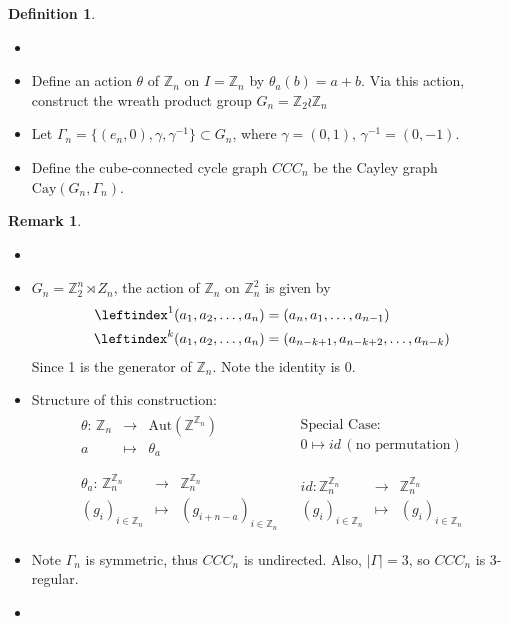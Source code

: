 \documentclass{book}
\newcommand{\Z}{\mathbb{Z}}
\newcommand{\abs}[1]{\lvert #1 \rvert }
\newcommand{\Cay}[1]{\textrm{Cay}( #1 )}
\newcommand{\Aut}[1]{\textrm{Aut}( #1 )}
\theoremstyle{definition}
\newtheorem{definition}[lemma]{Definition}
\theoremstyle{remarkstyle}
\newtheorem*{remark}{Remark}%
\begin{document}
\begin{definition}
\begin{itemize}
    \item[]
    \item Define an action $\theta$ of $\Z_{n} $ on $I = \Z_{n} $ by $\theta_{a}(b) = a+b $. Via this action, construct the wreath product group $G_{n} = \Z_{2} \wr \Z_{n} $
    \item Let $\Gamma_{n} = \{(e_{n},0),\gamma,\gamma^{-1}\} \subset G_{n} $, where $\gamma =(0,1), \, \gamma^{-1}=(0,-1) $.
    \item Define the cube-connected cycle graph $CCC_{n} $ be the Cayley graph $\Cay{G_{n}, \Gamma_{n}}$.
\end{itemize}
\end{definition}
\begin{remark}
\begin{itemize}
    \item[]
    \item $G_{n} = \Z^{n}_{2}\rtimes Z_{n} $, the action of $\Z_{n} $ on $\Z^{2}_{n} $ is given by 
    \begin{align*}
        \leftindex^{1} (a_{1},a_{2},\dots,a_{n}) &= (a_{n},a_{1},\dots,a_{n-1}) \\
        \leftindex^{k} (a_{1},a_{2},\dots,a_{n}) &= (a_{n-k+1},a_{n-k+2},\dots,a_{n-k})
    \end{align*}
    Since 1 is the generator of $\Z_{n} $. Note the identity is 0.
    \item Structure of this construction:
            $$
        \begin{array}{cc}
            \begin{array}{rcl}
                \theta: \, \Z_{n}  & \rightarrow & \Aut{\Z^{\Z_{n}} } \\
                a & \mapsto & \theta_{a}
            \end{array} & \begin{array}{c}
                \textrm{Special Case:} \\
                 0 \mapsto id \, (\textrm{no permutation})
            \end{array}  \\
            & \\
             \begin{array}{rcl}
                \theta_{a} : \, \Z_{n}^{\Z_{n}} &\rightarrow & \Z_{n}^{\Z_{n}} \\
                (g_{i})_{i\in \Z_{n}} &\mapsto & (g_{i+n-a})_{i\in \Z_{n} }
            \end{array} & \begin{array}{rcl}
                id: \Z_{n}^{\Z_{n}} &\rightarrow & \Z_{n}^{\Z_{n}} \\
                (g_{i})_{i\in \Z_{n}} &\mapsto & (g_{i})_{i\in \Z_{n}}
            \end{array}
        \end{array}
        $$
    \item Note $\Gamma_{n} $ is symmetric, thus $CCC_{n} $ is undirected. Also, $\abs{\Gamma}=3$, so $CCC_{n} $ is 3-regular.
    \item[] 
\end{itemize}
\end{remark}
\end{document}
